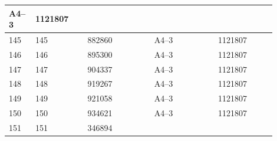 \documentclass[UTF8,10pt,a4paper,fontset=fandol]{ctexart}
\newcommand{\fieldvalue}[1]{#1}
\begin{document}
\begin{center}
\begin{tabular}{|p{0.07\linewidth}|p{0.18\linewidth}|p{0.23\linewidth}|p{0.22\linewidth}|p{0.20\linewidth}|}
\fieldvalue{A4--3} &
\fieldvalue{1121807} & \\
\hline
145 &
\fieldvalue{145} &
\fieldvalue{882860} &
\fieldvalue{A4--3} &
\fieldvalue{1121807} & \\
\hline
146 &
\fieldvalue{146} &
\fieldvalue{895300} &
\fieldvalue{A4--3} &
\fieldvalue{1121807} & \\
\hline
147 &
\fieldvalue{147} &
\fieldvalue{904337} &
\fieldvalue{A4--3} &
\fieldvalue{1121807} & \\
\hline
148 &
\fieldvalue{148} &
\fieldvalue{919267} &
\fieldvalue{A4--3} &
\fieldvalue{1121807} & \\
\hline
149 &
\fieldvalue{149} &
\fieldvalue{921058} &
\fieldvalue{A4--3} &
\fieldvalue{1121807} & \\
\hline
150 &
\fieldvalue{150} &
\fieldvalue{934621} &
\fieldvalue{A4--3} &
\fieldvalue{1121807} & \\
\hline
151 &
\fieldvalue{151} &
\fieldvalue{346894} &

\end{tabular}
\end{center}
\end{document}

